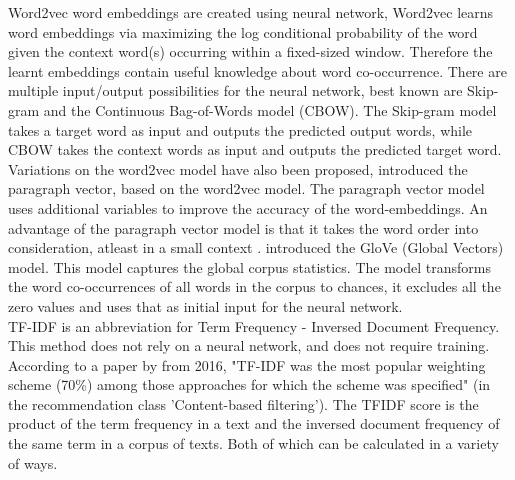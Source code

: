 \documentclass[../../Thesis.tex]{subfiles}
\begin{document}
\begin{jumpin}
Word2vec word embeddings are created using neural network, Word2vec learns word embeddings via maximizing the log conditional probability of the word given the context word(s) occurring within a fixed-sized window. Therefore the learnt embeddings contain useful knowledge about word co-occurrence\cite{nalisnick2016improving}. There are multiple input/output possibilities for the neural network, best known are Skip-gram and the Continuous Bag-of-Words model (CBOW). The Skip-gram model takes a target word as input and outputs the predicted output words, while CBOW takes the context words as input and outputs the predicted target word\cite{nalisnick2016improving, pennington2014glove}.
Variations on the word2vec model have also been proposed, \citet{le2014distributed} introduced the paragraph vector, based on the word2vec model. The paragraph vector model uses additional variables to improve the accuracy of the word-embeddings. An advantage of the paragraph vector model is that it takes the word order into consideration, atleast in a small context \cite{le2014distributed}.
\citet{pennington2014glove} introduced the GloVe (Global Vectors) model. This model captures the global corpus statistics. The model transforms the word co-occurrences of all words in the corpus to chances, it excludes all the zero values and uses that as initial input for the neural network.\\
TF-IDF is an abbreviation for Term Frequency - Inversed Document Frequency. This method does not rely on a neural network, and does not require training. According to a paper by \citet{beel2016paper} from 2016, "TF-IDF was the most popular weighting scheme (70\%) among those approaches for which the scheme was specified" (in the recommendation class 'Content-based filtering'). The TFIDF score is the product of the term frequency in a text and the inversed document frequency of the same term in a corpus of texts. Both of which can be calculated in a variety of ways.
\end{jumpin}
\end{document}
